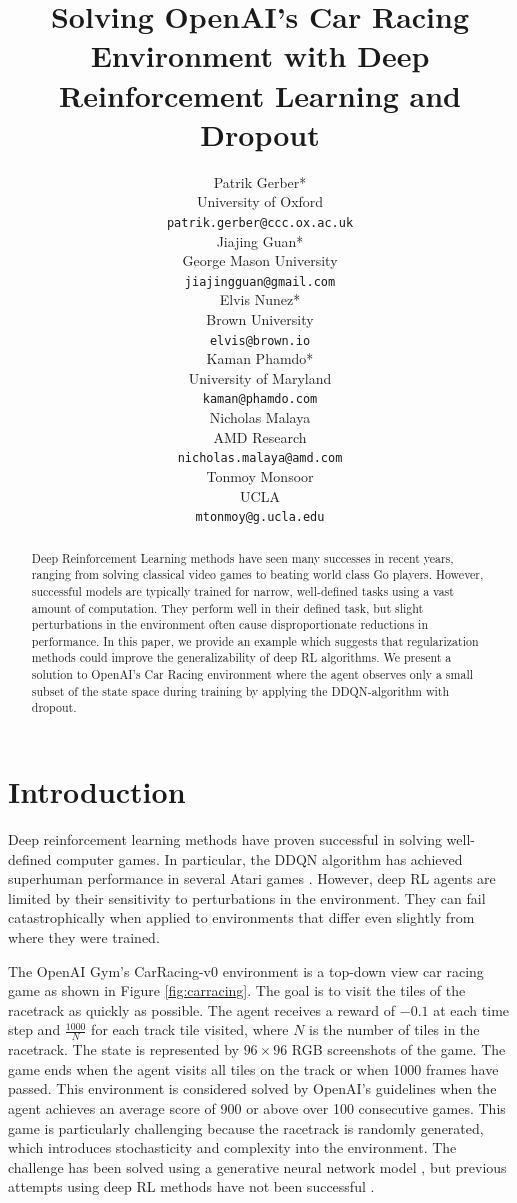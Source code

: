 \documentclass{article}
\title{Solving OpenAI's Car Racing Environment with Deep Reinforcement Learning and Dropout}
\author{
  Patrik Gerber* \\
  University of Oxford \\
  \texttt{patrik.gerber@ccc.ox.ac.uk} \\
  \And
  Jiajing Guan* \\
  George Mason University \\ 
  \texttt{jiajingguan@gmail.com} \\
  \And
  Elvis Nunez* \\
  Brown University \\
  \texttt{elvis@brown.io} \\
  \And
  Kaman Phamdo* \\
  University of Maryland \\
  \texttt{kaman@phamdo.com} \\
  \And
  Nicholas Malaya \\
  AMD Research \\ 
  \texttt{nicholas.malaya@amd.com} \\
  \And
  Tonmoy Monsoor \\
  UCLA \\
  \texttt{mtonmoy@g.ucla.edu} \\
}
\begin{document}

\maketitle

\begin{abstract}
Deep Reinforcement Learning methods have seen many successes in recent years, ranging from solving classical video games to beating world class Go players. However, successful models are typically trained for narrow, well-defined tasks using a vast amount of computation. They perform well in their defined task, but slight perturbations in the environment often cause disproportionate reductions in performance. In this paper, we provide an example which suggests that regularization methods could improve the generalizability of deep RL algorithms. We present a solution to OpenAI’s Car Racing environment where the agent observes only a small subset of the state space during training by applying the DDQN-algorithm with dropout.
\end{abstract}

\section{Introduction}
Deep reinforcement learning methods have proven successful in solving well-defined computer games. In particular, the DDQN algorithm has achieved superhuman performance in several Atari games \cite{DQN}. However, deep RL agents are limited by their sensitivity to perturbations in the environment. They can fail catastrophically when applied to environments that differ even slightly from where they were trained.

The OpenAI Gym’s CarRacing-v0 environment \cite{CarRacing} is a top-down view car racing game as shown in Figure \ref{fig:carracing}. The goal is to visit the tiles of the racetrack as quickly as possible. The agent receives a reward of $-0.1$ at each time step and $\frac{1000}{N}$ for each track tile visited, where $N$ is the number of tiles in the racetrack. The state is represented by $96\times96$ RGB screenshots of the game. The game ends when the agent visits all tiles on the track or when 1000 frames have passed. This environment is considered solved by OpenAI’s guidelines when the agent achieves an average score of 900 or above over 100 consecutive games. This game is particularly challenging because the racetrack is randomly generated, which introduces stochasticity and complexity into the environment.  The challenge has been solved using a generative neural network model \cite{World_Models}, but previous attempts using deep RL methods have not been successful \cite{CarRacing1}. %
\end{document}
